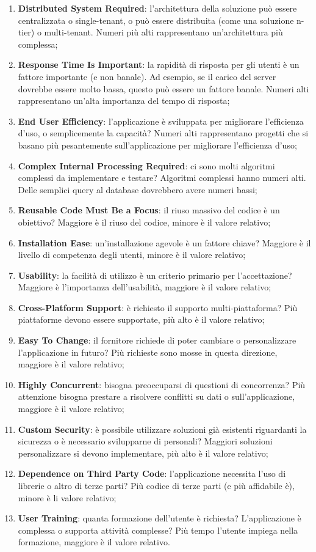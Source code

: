 \begin{enumerate}
	\item \textbf{Distributed System Required}: l'architettura della soluzione può essere centralizzata o single-tenant, o può essere distribuita (come una soluzione n-tier) o multi-tenant. Numeri più alti rappresentano un'architettura più complessa;
	\item \textbf{Response Time Is Important}: la rapidità di risposta per gli utenti è un fattore importante (e non banale). Ad esempio, se il carico del server dovrebbe essere molto bassa, questo può essere un fattore banale. Numeri alti rappresentano un'alta importanza del tempo di risposta;
	\item \textbf{End User Efficiency}: l'applicazione è sviluppata per migliorare l'efficienza d'uso, o semplicemente la capacità? Numeri alti rappresentano progetti che si basano più pesantemente sull'applicazione per migliorare l'efficienza d'uso;
	\item \textbf{Complex Internal Processing Required}: ci sono molti algoritmi complessi da implementare e testare? Algoritmi complessi hanno numeri alti. Delle semplici query al database dovrebbero avere numeri bassi;
	\item \textbf{Reusable Code Must Be a Focus}: il riuso massivo del codice è un obiettivo? Maggiore è il riuso del codice, minore è il valore relativo;
	\item \textbf{Installation Ease}: un'installazione agevole è un fattore chiave? Maggiore è il livello di competenza degli utenti, minore è il valore relativo;
	\item \textbf{Usability}: la facilità di utilizzo è un criterio primario per l'accettazione? Maggiore è l'importanza dell'usabilità, maggiore è il valore relativo;
	\item \textbf{Cross-Platform Support}: è richiesto il supporto multi-piattaforma? Più piattaforme devono essere supportate, più alto è il valore relativo;
	\item \textbf{Easy To Change}: il fornitore richiede di poter cambiare o personalizzare l'applicazione in futuro? Più richieste sono mosse in questa direzione, maggiore è il valore relativo;
	\item \textbf{Highly Concurrent}: bisogna preoccuparsi di questioni di concorrenza? Più attenzione bisogna prestare a risolvere conflitti su dati o sull'applicazione, maggiore è il valore relativo;
	\item \textbf{Custom Security}: è possibile utilizzare soluzioni già esistenti riguardanti la sicurezza o è necessario svilupparne di personali? Maggiori soluzioni personalizzare si devono implementare, più alto è il valore relativo;
	\item \textbf{Dependence on Third Party Code}: l'applicazione necessita l'uso di librerie o altro di terze parti? Più codice di terze parti (e più affidabile è), minore è li valore relativo;
	\item \textbf{User Training}: quanta formazione dell'utente è richiesta? L'applicazione è complessa o supporta attività complesse? Più tempo l'utente impiega nella formazione, maggiore è il valore relativo. 
\end{enumerate}

